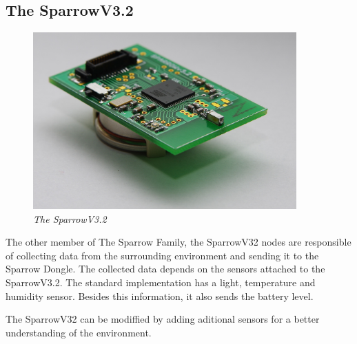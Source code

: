 \subsection{The SparrowV3.2}

\begin{figure}[ht]
\begin{center}
\includegraphics[width=0.9\textwidth]{hw_platform/Sparrowv32.jpg}
\end{center}
\caption{\small \itshape{The SparrowV3.2}}
\end{figure}

The other member of The Sparrow Family, the SparrowV32 nodes are responsible of collecting data from the surrounding environment and sending it to the Sparrow Dongle. The collected data depends on the sensors attached to the SparrowV3.2. The standard implementation has a light, temperature and humidity sensor. Besides this information, it also sends the battery level.

The SparrowV32 can be modiffied by adding aditional sensors for a better understanding of the environment.
